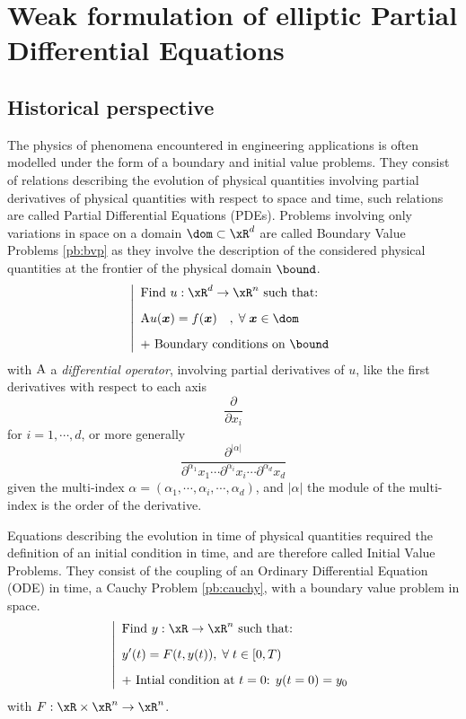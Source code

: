 
\chapter[Weak formulation of elliptic PDEs]{Weak formulation of elliptic Partial Differential Equations}\label{chap:wf}

\section{Historical perspective}

The physics of phenomena encountered in engineering applications is often modelled under the form of a boundary and initial value problems.
They consist of relations describing the evolution of physical quantities involving partial derivatives of physical quantities with respect to space and time, such relations are called Partial Differential Equations (PDEs).
Problems involving only variations in space on a domain $\dom \subset \xR^d$ are called Boundary Value Problems \eqref{pb:bvp} as they involve the description of the considered physical quantities at the frontier of the physical domain $\bound$.
\begin{equation}\label{pb:bvp}
\left\lvert
\begin{array}{ll}
\mbox{Find $u: \xR^d \rightarrow \xR^n$ such that:}\\[2ex]
\displaystyle\matA u(\xx) = f(\xx)\quad,\;\forany  \xx\in \dom\\[2ex]
\mbox{+ Boundary conditions on $\bound$}
\end{array}
\right .
\end{equation}
with ${\mathrm A}$ a \textit{differential operator}, \ie involving partial derivatives of $u$, like the first derivatives with respect to each axis
\[
\displaystyle \frac{\partial}{\partial x_i}
\]
for $i = 1,\cdots,d$, or more generally
\[
\displaystyle \frac{\partial^{|\alpha|}}{\partial^{\alpha_1}x_1\cdots\partial^{\alpha_i}x_i\cdots\partial^{\alpha_d}x_d}
\]
given the multi-index $\alpha = (\alpha_1, \cdots, \alpha_i, \cdots, \alpha_d)$, and $|\alpha|$ the module of the multi-index is the order of the derivative.

\medskip
Equations describing the evolution in time of physical quantities required the definition of an initial condition in time, and are therefore called Initial Value Problems.
They consist of the coupling of an Ordinary Differential Equation (ODE) in time, a Cauchy Problem \eqref{pb:cauchy}, with a boundary value problem in space.
\begin{equation}\label{pb:cauchy}
\left\lvert
\begin{array}{ll}
\mbox{Find $y: \xR \rightarrow \xR^n$ such that:}\\[2ex]
\displaystyle y'(t) = F(t, y(t)),\;\forany  t\in [0,T)\\[2ex]
\mbox{+ Intial condition at $t = 0$: $y(t=0) = y_0$}
\end{array}
\right .
\end{equation}
with $F:\xR\times\xR^n \rightarrow \xR^n$.

